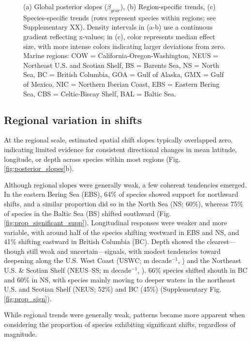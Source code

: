 \documentclass[lineno,pdflatex,sn-nature]{sn-jnl}%
\begin{document}
\begin{figure}[h]
{(a) Global posterior slopes ($\beta_{year}$),  
(b) Region-specific trends,  
(c) Species-specific trends (rows represent species within regions; see Supplementary XX).  
Density intervals in (a-b) use a continuous gradient reflecting x-values; in (c), color represents median effect size, with more intense colors indicating larger deviations from zero.  
Marine regions: COW = California-Oregon-Washington, NEUS = Northeast U.S. and Scotian Shelf, BS = Barents Sea, NS = North Sea, BC = British Columbia, GOA = Gulf of Alaska, GMX = Gulf of Mexico, NIC = Northern Iberian Coast, EBS = Eastern Bering Sea, CBS = Celtic-Biscay Shelf, BAL = Baltic Sea.}
\end{figure}

\subsection{Regional variation in shifts}



At the regional scale, estimated spatial shift slopes typically overlapped zero, indicating limited evidence for consistent directional changes in mean latitude, longitude, or depth across species within most regions (Fig.\ref{fig:posterior_slopes}b).

Although regional slopes were generally weak, a few coherent tendencies emerged. In the eastern Bering Sea (EBS), 64\% of species showed support for northward shifts, and a similar proportion did so in the North Sea (NS; 60\%), whereas 75\% of species in the Baltic Sea (BS) shifted southward (Fig. \ref{fig:prop_significant_supp}). Longitudinal responses were weaker and more variable, with around half of the species shifting westward in EBS and NS, and 41\% shifting eastward in British Columbia (BC). 
Depth showed the clearest—though still weak and uncertain—signals, with modest tendencies toward deepening along the U.S. West Coast (USWC; \DepthUSWCMedian{} m decade$^{-1}$, \DepthUSWCCI{}) and the Northeast U.S. \& Scotian Shelf (NEUS–SS; \DepthNEUSMedian{} m decade$^{-1}$, \DepthNEUSCI{}). 66\% species shifted shouth in BC  and 60\% in NS, with species mainly moving to deeper waters in the northeast U.S. and Scotian Shelf (NEUS; 52\%) and BC (45\%) (Supplementary Fig. \ref{fig:prop_sign}).







While regional trends were generally weak, patterns became more apparent when considering the proportion of species exhibiting significant shifts, regardless of magnitude. 
\end{document}
